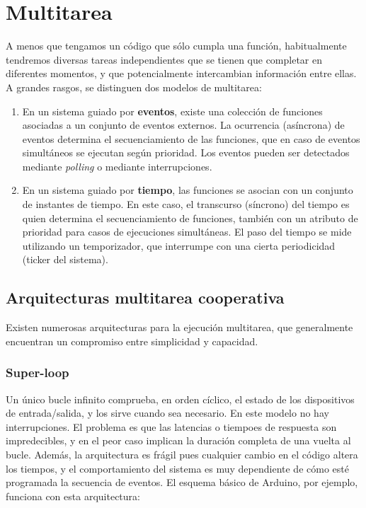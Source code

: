 \documentclass[../main.tex]{subfiles}
\begin{document}
\section{Multitarea}

    A menos que tengamos un código que sólo cumpla una función, habitualmente tendremos diversas tareas independientes que se tienen que completar en diferentes momentos, y que potencialmente intercambian información entre ellas. A grandes rasgos, se distinguen dos modelos de multitarea:

    \begin{enumerate}
        \item En un sistema guiado por \textbf{eventos}, existe una colección de funciones asociadas a un conjunto de eventos externos. La ocurrencia (asíncrona) de eventos determina el secuenciamiento de las funciones, que en caso de eventos simultáneos se ejecutan según prioridad. Los eventos pueden ser detectados mediante \emph{polling} o mediante interrupciones.
        \item En un sistema guiado por \textbf{tiempo}, las funciones se asocian con un conjunto de instantes de tiempo. En este caso, el transcurso (síncrono) del tiempo es quien determina el secuenciamiento de funciones, también con un atributo de prioridad para casos de ejecuciones simultáneas. El paso del tiempo se mide utilizando un temporizador, que interrumpe con una cierta periodicidad (ticker del sistema).
    \end{enumerate}

    \subsection{Arquitecturas multitarea cooperativa}\label{sub:cooptask}
    
        Existen numerosas arquitecturas para la ejecución multitarea, que generalmente encuentran un compromiso entre simplicidad y capacidad. 

        \subsubsection{Super-loop}

            Un único bucle infinito comprueba, en orden cíclico, el estado de los dispositivos de entrada/salida, y los sirve cuando sea necesario. En este modelo no hay interrupciones. El problema es que las latencias o tiempoes de respuesta son impredecibles, y en el peor caso implican la duración completa de una vuelta al bucle. Además, la arquitectura es frágil pues cualquier cambio en el código altera los tiempos, y el comportamiento del sistema es muy dependiente de cómo esté programada la secuencia de eventos. El esquema básico de Arduino, por ejemplo, funciona con esta arquitectura:
\end{document}
